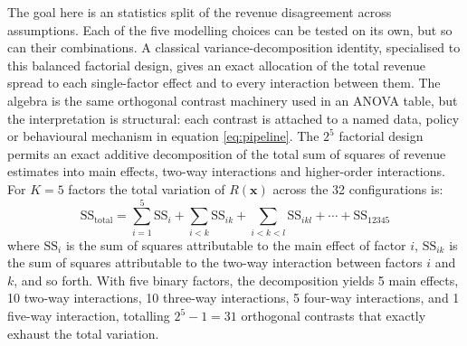 \documentclass[11pt,a4paper]{article}
\begin{document}
The goal here is an statistics split of the revenue disagreement across assumptions. Each of the five modelling choices can be tested on its own, but so can their combinations. A classical variance-decomposition identity, specialised to this balanced factorial design, gives an exact allocation of the total revenue spread to each single-factor effect and to every interaction between them. The algebra is the same orthogonal contrast machinery used in an ANOVA table, but the interpretation is structural: each contrast is attached to a named data, policy or behavioural mechanism in equation \eqref{eq:pipeline}. The $2^5$ factorial design permits an exact additive decomposition of the total sum of squares of revenue estimates into main effects, two-way interactions and higher-order interactions. For $K = 5$ factors the total variation of $R(\mathbf{x})$ across the 32 configurations is:
\begin{equation}\label{eq:anova}
\text{SS}_{\text{total}} = \sum_{i=1}^{5} \text{SS}_i + \sum_{i<k} \text{SS}_{ik} + \sum_{i<k<l} \text{SS}_{ikl} + \cdots + \text{SS}_{12345}
\end{equation}
where $\text{SS}_i$ is the sum of squares attributable to the main effect of factor $i$, $\text{SS}_{ik}$ is the sum of squares attributable to the two-way interaction between factors $i$ and $k$, and so forth. With five binary factors, the decomposition yields 5 main effects, 10 two-way interactions, 10 three-way interactions, 5 four-way interactions, and 1 five-way interaction, totalling $2^5 - 1 = 31$ orthogonal contrasts that exactly exhaust the total variation.
\end{document}
